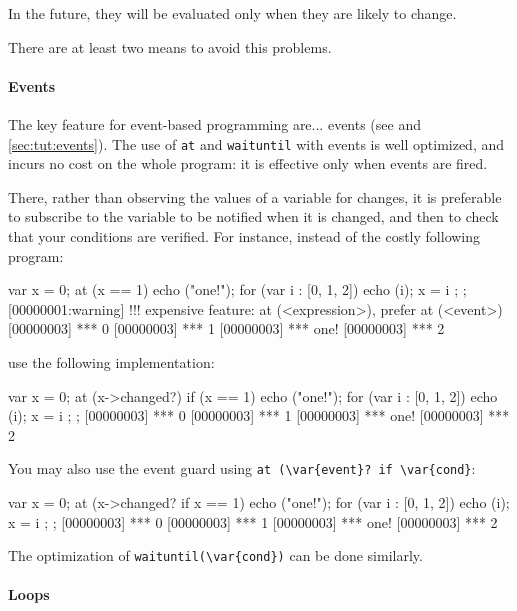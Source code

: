 In the future, they will be evaluated only when they are likely to
change.

There are at least two means to avoid this problems.

\paragraph{Events}
The key \us feature for event-based programming are... events (see
 and \autoref{sec:tut:events}).  The use of
\lstinline|at| and \lstinline|waituntil| with events is well
optimized, and incurs no cost on the whole program: it is effective
only when events are fired.

There, rather than observing the values of a variable for changes, it
is preferable to subscribe to the variable to be notified when it is
changed, and then to check that your conditions are verified.  For
instance, instead of the costly following program:

\begin{urbiscript}[firstnumber=last]
{
  var x = 0;
  at (x == 1)
    echo ("one!");
  for (var i : [0, 1, 2])
  {
    echo (i);
    x = i
  };
};
[00000001:warning] !!! expensive feature: at (<expression>), prefer at (<event>)
[00000003] *** 0
[00000003] *** 1
[00000003] *** one!
[00000003] *** 2
\end{urbiscript}

\noindent
use the following implementation:

\begin{urbiscript}[firstnumber=last]
{
  var x = 0;
  at (x->changed?)
    if (x == 1)
      echo ("one!");
  for (var i : [0, 1, 2])
  {
    echo (i);
    x = i
  };
};
[00000003] *** 0
[00000003] *** 1
[00000003] *** one!
[00000003] *** 2
\end{urbiscript}

You may also use the event guard using %
\lstinline|at (\var{event}? if \var{cond}|:

\begin{urbiscript}[firstnumber=last]
{
  var x = 0;
  at (x->changed? if x == 1)
      echo ("one!");
  for (var i : [0, 1, 2])
  {
    echo (i);
    x = i
  };
};
[00000003] *** 0
[00000003] *** 1
[00000003] *** one!
[00000003] *** 2
\end{urbiscript}

The optimization of \lstinline|waituntil(\var{cond})| can be done
similarly.

\paragraph{Loops}

